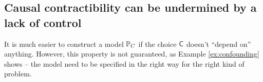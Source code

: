 

\subsection{Causal contractibility can be undermined by a lack of control}\label{sec:assessing}

It is much easier to construct a model $\mathbb{P}_C$ if the choice $\mathsf{C}$ doesn't ``depend on'' anything. However, this property is not guaranteed, as Example \ref{ex:confounding} shows -- the model need to be specified in the right way for the right kind of problem. 

